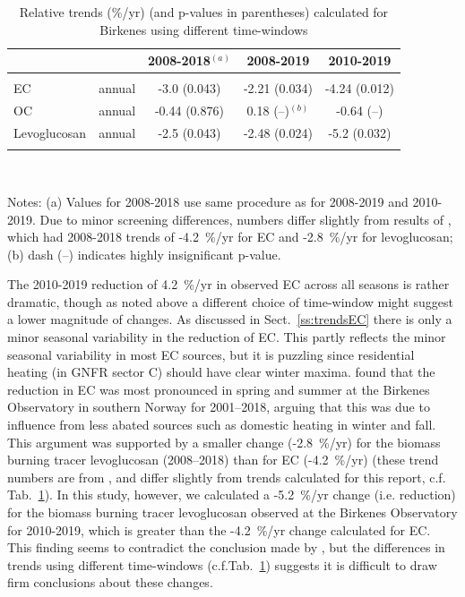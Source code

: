 \begin{table}[H]
\centering
\parbox{11.9cm}{
\caption{Relative trends (\%/yr) (and p-values in parentheses) calculated for Birkenes 
    using different time-windows \label{tab:BirkenesTrends}}}
\begin{tabular}{lcccc}
\toprule
     &         & 2008-2018$^{(a)}$& 2008-2019     & 2010-2019       \\
\midrule
 & & & & \\
EC   & annual  & -3.0 (0.043)        &  -2.21 (0.034)   & -4.24 (0.012) \\
OC   & annual  &  -0.44 (0.876)      &   0.18 (--)$^{(b)}$     & -0.64 (--)   \\
Levoglucosan & annual  & -2.5 (0.043)        &  -2.48 (0.024)   & -5.2  (0.032) \\
& & & & \\
\bottomrule 
\end{tabular}\\
\parbox{11.9cm}{

Notes:
(a) Values for 2008-2018 use same procedure as for 2008-2019 and 2010-2019.
Due to minor screening differences, numbers
differ slightly from results of \citet{Yttri2021}, which had 2008-2018 trends of -4.2~\%/yr for EC and -2.8~\%/yr for levoglucosan;
(b) dash (--) indicates highly insignificant p-value.\\
}
\end{table}


The 2010-2019 reduction of 4.2~\%/yr in observed EC across all seasons is rather dramatic, though as noted above a different choice of time-window might suggest a lower magnitude of changes. 
As discussed in Sect.~\ref{ss:trendsEC} there is only a minor seasonal variability in the reduction of EC. This partly reflects the minor seasonal variability in most EC sources, but it is puzzling since residential heating (in GNFR sector C) should have clear winter maxima. \citet{Yttri2021} found that the reduction in EC
was most pronounced in spring and summer at the Birkenes Observatory in
southern Norway for 2001--2018, arguing that this was due to influence
from less abated sources such as domestic heating in winter and fall. This argument was
supported by a smaller change (-2.8~\%/yr) for the biomass burning
tracer levoglucosan (2008--2018) than for EC (-4.2~\%/yr) (these trend numbers are from \citeauthor{Yttri2021}, and differ slightly from trends calculated for this report, c.f. Tab.~\ref{tab:BirkenesTrends}). In this study, however, 
we calculated a -5.2~\%/yr change (i.e. reduction) for the biomass burning tracer
levoglucosan observed at the Birkenes Observatory for 2010-2019, which is
greater than the -4.2~\%/yr change calculated for EC.
This finding seems to contradict the conclusion made
by \citet{Yttri2021}, but the differences in trends using different time-windows (c.f.Tab.~\ref{tab:BirkenesTrends}) suggests it is difficult to draw firm conclusions about these changes.


